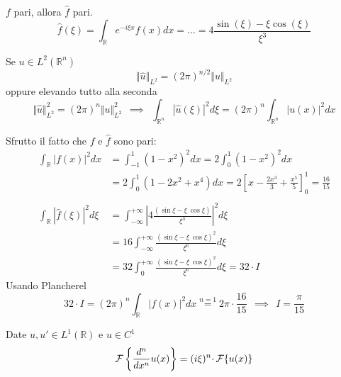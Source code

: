 $f$ pari, allora $\hat{f}$ pari.
\begin{equation*}
\hat{f}( \xi ) =\int _{\mathbb{R}} e^{-i\xi x} f( x) dx=...=4\frac{\sin( \xi ) -\xi \cos( \xi )}{\xi ^{3}}
\end{equation*}
\begin{thm}
 Se $\displaystyle u\in L^{2}\left(\mathbb{R}^{n}\right)$
\begin{equation*}
\Vert \hat{u}\Vert _{L^{2}} =( 2\pi )^{n/2}\Vert u\Vert _{L^{2}}
\end{equation*}
oppure elevando tutto alla seconda
\begin{equation*}
\Vert \hat{u}\Vert ^{2}_{L^{2}} =( 2\pi )^{n}\Vert u\Vert ^{2}_{L^{2}} \ \ \implies \ \ \int _{\mathbb{R}^{n}}| \hat{u}( \xi )| ^{2} d\xi =( 2\pi )^{n}\int _{\mathbb{R}^{n}}| u( x)| ^{2} dx
\end{equation*}
\end{thm}
Sfrutto il fatto che $f$ e $\hat{f}$ sono pari:
\begin{align*}
\int _{\mathbb{R}}| f( x)| ^{2} dx & =\int ^{1}_{-1}\left( 1-x^{2}\right)^{2} dx=2\int ^{1}_{0}\left( 1-x^{2}\right)^{2} dx\\
 & =2\int ^{1}_{0}\left( 1-2x^2+x^{4}\right) dx=2\left[ x-\frac{2x^{3}}{3} +\frac{x^{5}}{5}\right]^{1}_{0} =\frac{16}{15}\\
 & \\
\int _{\mathbb{R}}| \hat{f}( \xi )| ^{2} d\xi  & =\int ^{+\infty }_{-\infty }\left| 4\frac{(\sin \xi -\xi \ \cos \xi )}{\xi ^{3}}\right| ^{2} d\xi \\
 & =16\int ^{+\infty }_{-\infty }\frac{(\sin \xi -\xi \ \cos \xi )^{2}}{\xi ^{6}} d\xi \\
 & =32\int ^{+\infty }_{0}\frac{(\sin \xi -\xi \ \cos \xi )^{2}}{\xi ^{6}} d\xi =32\cdotp I
\end{align*}
Usando Plancherel
\begin{equation*}
32\cdotp I=( 2\pi )^{n}\int _{\mathbb{R}}| f( x)| ^{2} dx\overset{n=1}{=} 2\pi \cdotp \frac{16}{15} \ \ \implies \ \ I=\frac{\pi }{15}
\end{equation*}
\Soluzione
\begin{thm}
 Date $u,u'\in L^{1}(\mathbb{R})$ e $u\in C^{1}$
\begin{equation*}
\mathcal{F} \left\{\frac{d^{n}}{dx^{n}} u( x)\right\} =( i\xi )^{n} \cdotp \mathcal{F} \{u( x)\}
\end{equation*}
\end{thm}
